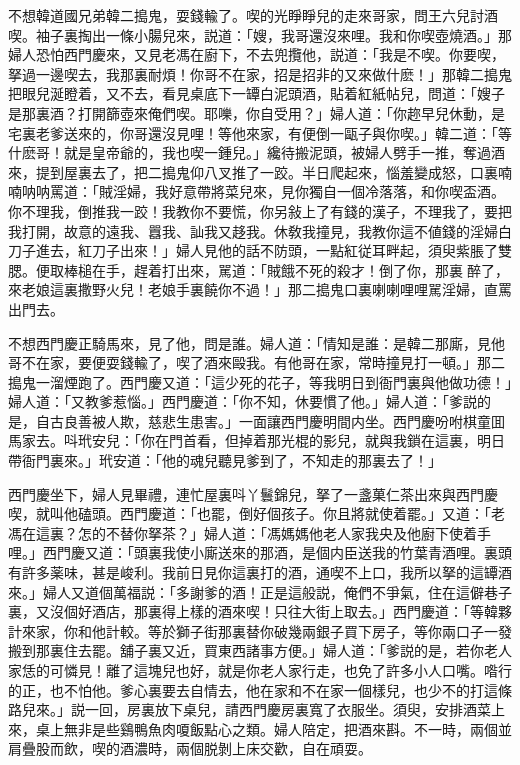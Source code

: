 不想韓道國兄弟韓二搗鬼，耍錢輸了。喫的光睜睜兒的走來哥家，問王六兒討酒喫。袖子裏掏出一條小腸兒來，説道：「嫂，我哥還沒來哩。我和你喫壺燒酒。」那婦人恐怕西門慶來，又見老馮在廚下，不去兜攬他，説道：「我是不喫。你要喫，拏過一邊喫去，我那裏耐煩！你哥不在家，招是招非的又來做什麽！」那韓二搗鬼把眼兒涎瞪着，又不去，看見桌底下一罈白泥頭酒，貼着紅紙帖兒，問道：「嫂子是那裏酒？打開篩壺來俺們喫。耶嚛，你自受用？」婦人道：「你趂早兒休動，是宅裏老爹送來的，你哥還沒見哩！等他來家，有便倒一甌子與你喫。」韓二道：「等什麽哥！就是皇帝爺的，我也喫一鍾兒。」纔待搬泥頭，被婦人劈手一推，奪過酒來，提到屋裏去了，把二搗鬼仰八叉推了一跤。半日爬起來，惱羞變成怒，口裏喃喃呐呐罵道：「賊淫婦，我好意帶將菜兒來，見你獨自一個冷落落，和你喫盃酒。你不理我，倒推我一跤！我教你不要慌，你另敍上了有錢的漢子，不理我了，要把我打開，故意的遠我、囂我、訕我又趍我。休敎我撞見，我教你這不値錢的淫婦白刀子進去，紅刀子出來！」婦人見他的話不防頭，一點紅従耳畔起，須臾紫脹了雙腮。便取棒槌在手，趕着打出來，駡道：「賊餓不死的殺才！倒了你，那裏𠳹醉了，來老娘這裏撒野火兒！老娘手裏饒你不過！」那二搗鬼口裏喇喇哩哩駡淫婦，直罵出門去。

不想西門慶正騎馬來，見了他，問是誰。婦人道：「情知是誰：是韓二那廝，見他哥不在家，要便耍錢輸了，喫了酒來毆我。有他哥在家，常時撞見打一頓。」那二搗鬼一溜煙跑了。西門慶又道：「這少死的花子，等我明日到衙門裏與他做功德！」婦人道：「又教爹惹惱。」西門慶道：「你不知，休要慣了他。」婦人道：「爹説的是，自古良善被人欺，慈悲生患害。」一面讓西門慶明間内坐。西門慶吩咐棋童囬馬家去。呌玳安兒：「你在門首看，但掉着那光棍的影兒，就與我鎖在這裏，明日帶衙門裏來。」玳安道：「他的魂兒聽見爹到了，不知走的那裏去了！」

西門慶坐下，婦人見畢禮，連忙屋裏呌丫鬟錦兒，拏了一盞菓仁茶出來與西門慶喫，就叫他磕頭。西門慶道：「也罷，倒好個孩子。你且將就使着罷。」又道：「老馮在這裏？怎的不替你拏茶？」婦人道：「馮媽媽他老人家我央及他廚下使着手哩。」西門慶又道：「頭裏我使小廝送來的那酒，是個内臣送我的竹葉青酒哩。裏頭有許多薬味，甚是峻利。我前日見你這裏打的酒，通喫不上口，我所以拏的這罈酒來。」婦人又道個萬福説：「多謝爹的酒！正是這般説，俺們不爭氣，住在這僻巷子裏，又沒個好酒店，那裏得上樣的酒來喫！只往大街上取去。」西門慶道：「等韓夥計來家，你和他計較。等於獅子街那裏替你破幾兩銀子買下房子，等你兩口子一發搬到那裏住去罷。舖子裏又近，買東西諸事方便。」婦人道：「爹説的是，若你老人家恁的可憐見！離了這塊兒也好，就是你老人家行走，也免了許多小人口嘴。喒行的正，也不怕他。爹心裏要去自情去，他在家和不在家一個樣兒，也少不的打這條路兒來。」説一回，房裏放下桌兒，請西門慶房裏寬了衣服坐。須臾，安排酒菜上來，桌上無非是些鷄鴨魚肉嗄飯點心之類。婦人陪定，把酒來斟。不一時，兩個並肩疊股而飲，喫的酒濃時，兩個脱剝上床交歡，自在頑耍。

